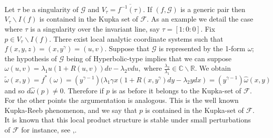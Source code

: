\documentclass{amsart}
\theoremstyle{definition}
\theoremstyle{proposition}
\numberwithin{equation}{section}
\theoremstyle{main}
\begin{document}
Let $\tau$ be a singularity of $\mathcal{G}$ and $V_{\tau}=\overline{f^{-1}(\tau)}$.  If $(f,\mathcal G)$ is a generic pair then $V_{\tau}\backslash I(f)$ is contained in the Kupka set  of $\mathcal F$. As an example we detail the case where $\tau$ is a singularity over the invariant line, say $\tau=[1:0:0]$. Fix $p\in V_{\tau}\backslash I(f)$. There exist local analytic coordinate systems such that $f(x,y,z)=(x,y^{\gamma})=(u,v)$. Suppose that $\mathcal {G}$ is represented by the 1-form $\omega$; the hypothesis of $\mathcal G$ being of Hyperbolic-type implies that we can suppose $\omega(u,v) =  \lambda_{1}u(1+R(u,v))dv - \lambda_{2}vdu,$ where $\frac{\lambda_{2}}{\lambda_{1}} \in \mathbb{C}\backslash \mathbb{R}$. We obtain $\tilde \omega(x,y)=f^{\ast}(\omega)=(y^{\gamma -1})(\lambda_{1}\gamma x(1+R(x,y^{\gamma})dy-\lambda_{2}ydx)=(y^{\gamma -1})\hat \omega(x,y)$ and so $d\hat \omega(p)\neq0$. Therefore if $p$ is as before it belongs to the Kupka-set of $\mathcal {F}$. For the other points the argumentation is analogous. This is the well known Kupka-Reeb phenomenon, and we say that $p$ is contained in the Kupka-set of $\mathcal {F}$. It is known that this local product structure is stable under small perturbations of $\mathcal F$ for instance, see \cite{kupka},\cite{gln}. 
 
\end{document}
